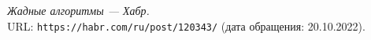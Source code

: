 \begin{thebibliography}{99}
{\itshape Жадные алгоритмы — Хабр.} \\URL: \texttt{https://habr.com/ru/post/120343/} (дата обращения: 20.10.2022).
\end{thebibliography}
\pagebreak


